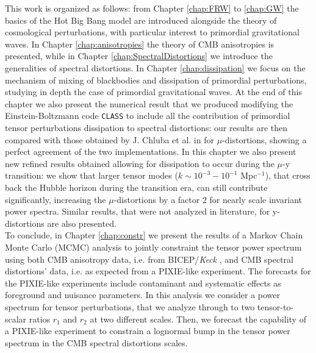 This work is organized as follows: from Chapter \ref{chap:FRW} to \ref{chap:GW} the basics of the Hot Big Bang model are introduced alongside the theory of cosmological perturbations, with particular interest to primordial gravitational waves. In Chapter \ref{chap:anisotropies} the theory of CMB anisotropies is presented, while in Chapter \ref{chap:SpectralDistortions} we introduce the generalities of spectral distortions. In Chapter \ref{chap:dissipation} we focus on the mechanism of mixing of blackbodies and dissipation of primordial perturbations, studying in depth the case of primordial gravitational waves. At the end of this chapter we also present the numerical result that we produced modifying the Einstein-Boltzmann code \texttt{CLASS} \cite{CLASS} to include all the contribution of primordial tensor perturbations dissipation to spectral distortions: our results are then compared with those obtained by J. Chluba et al. in \cite{Chluba_tens_diss} for $\mu$-distortions, showing a perfect agreement of the two implementations. In this chapter we also present new refined results obtained allowing for dissipation to occur during the $\mu$-y transition: we show that larger tensor modes ($k\sim 10^{-3}-10^{-1}$ Mpc$^{-1}$), that cross back the Hubble horizon during the transition era, can still contribute significantly, increasing the $\mu$-distortions by a factor 2 for nearly scale invariant power spectra. Similar results, that were not analyzed in literature, for y-distortions are also presented.\\
To conclude, in Chapter \ref{chap:constr} we present the results of a Markov Chain Monte Carlo (MCMC) analysis to jointly constraint the tensor power spectrum using both CMB anisotropy data, i.e. from BICEP/\textit{Keck} \cite{Ade_2021}, and CMB spectral distortions' data, i.e. as expected from a PIXIE-like experiment. The forecasts for the PIXIE-like experiments include contaminant and systematic effects as foreground and nuisance parameters. In this analysis we consider a power spectrum for tensor perturbations, that we analyze through to two tensor-to-scalar ratios $r_1$ and $r_2$ at two different scales. Then, we forecast the capability of a PIXIE-like experiment to constrain a lognormal bump in the tensor power spectrum in the CMB spectral distortions scales.   